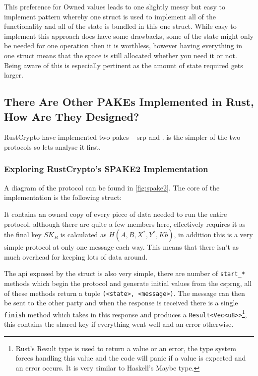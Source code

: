 This preference for Owned values leads to one slightly messy but easy to implement pattern whereby one struct is used to implement all of the functionality and all of the state is bundled in this one struct.
While easy to implement this approach does have some drawbacks, some of the state might only be needed for one operation then it is worthless, however having everything in one struct means that the space is still allocated whether you need it or not.
Being aware of this is especially pertinent as the amount of state required gets larger.

\subsection{There Are Other PAKEs Implemented in Rust, How Are They Designed?}
RustCrypto have implemented two \glspl{pake} -- \gls{srp} and .
 is the simpler of the two protocols so lets analyse it first.

\subsubsection{Exploring RustCrypto's SPAKE2 Implementation}
A diagram of the  protocol can be found in \cref{fig:spake2}.
The core of the implementation is the following struct:

It contains an owned copy of every piece of data needed to run the entire protocol, although there are quite a few members here,  effectively requires it as the final key $SK_B$ is calculated as $H(A, B, X^*, Y^*, Kb)$, in addition this is a very simple protocol at only one message each way.
This means that there isn't as much overhead for keeping lots of data around.

The \gls{api} exposed by the struct is also very simple, there are number of \texttt{start\_*} methods which begin the protocol and generate initial values from the \gls{csprng}, all of these methods return a tuple \texttt{(<state>, <message>)}.
The message can then be sent to the other party and when the response is received there is a single \texttt{finish} method which takes in this response and produces a \texttt{Result<Vec<u8>>}\footnote{Rust's Result type is used to return a value or an error, the type system forces handling this value and the code will panic if a value is expected and an error occurs. It is very similar to Haskell's Maybe type.}, this contains the shared key if everything went well and an error otherwise.

